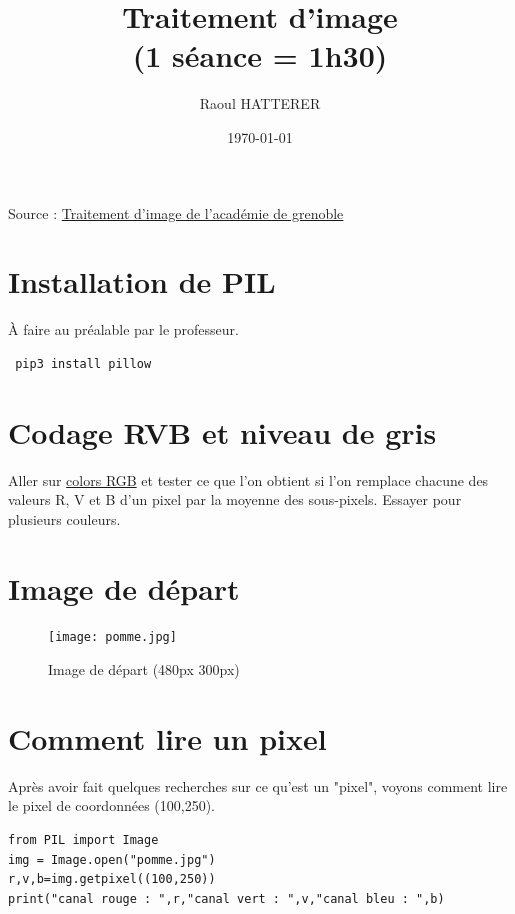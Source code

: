 \documentclass[11pt]{article}
\author{Raoul HATTERER}
\date{\today}
\title{Traitement d'image\\\medskip
\large (1 séance = 1h30)}
\begin{document}
\maketitle
\tableofcontents

Source : \href{http://www.ac-grenoble.fr/disciplines/informatiquelycee/n\_site/snt\_photo\_transImg.html}{Traitement d'image de l'académie de grenoble}

\section{Installation de PIL}
\label{sec:org2c21f8c}

À faire au préalable par le professeur.

\begin{verbatim}
 pip3 install pillow
\end{verbatim}


\section{Codage RVB et niveau de gris}
\label{sec:orga2489d6}

Aller sur \href{https://www.w3schools.com/colors/colors\_rgb.asp}{colors RGB} et tester ce que l'on obtient si l'on remplace chacune des valeurs R, V et B d'un pixel par la moyenne des sous-pixels.
Essayer pour plusieurs couleurs.


\section{Image de départ}
\label{sec:orgbc2eab3}

\begin{figure}[htbp]
\centering
\texttt{[image: pomme.jpg]}
\caption{Image de départ (480px \texttimes{} 300px)}
\end{figure}


\section{Comment lire un pixel}
\label{sec:orgcd4cde0}

Après avoir fait quelques recherches sur ce qu'est un "pixel", voyons comment lire le pixel de coordonnées (100,250).

\begin{verbatim}
from PIL import Image
img = Image.open("pomme.jpg")
r,v,b=img.getpixel((100,250))
print("canal rouge : ",r,"canal vert : ",v,"canal bleu : ",b)
\end{verbatim}
\end{document}

